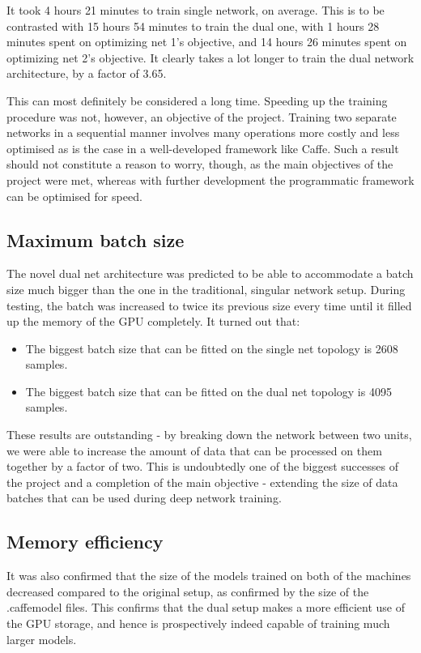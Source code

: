 \documentclass[a4paper, 12pt]{article}
\numberwithin{equation}{section}
\begin{document}
	It took 4 hours 21 minutes to train single network, on average. This is to be contrasted with 15 hours 54 minutes to train the dual one, with 1 hours 28 minutes spent on optimizing net 1's objective, and 14 hours 26 minutes spent on optimizing net 2's objective. It clearly takes a lot longer to train the dual network architecture, by a factor of 3.65.

	This can most definitely be considered a long time. Speeding up the training procedure was not, however, an objective of the project. Training two separate networks in a sequential manner involves  many operations more costly and less optimised as is the case in a well-developed framework like Caffe. Such a result should not constitute a reason to worry, though, as the main objectives of the project were met, whereas with further development the programmatic framework can be optimised for speed.

	\subsection{Maximum batch size}

	The novel dual net architecture was predicted to be able to accommodate a batch size much bigger than the one in the traditional, singular network setup. During testing, the batch was increased to twice its previous size every time until it filled up the memory of the GPU completely. It turned out that:
	\begin{itemize}
		\item The biggest batch size that can be fitted on the single net topology is 2608 samples.
		\item The biggest batch size that can be fitted on the dual net topology is 4095 samples.
	\end{itemize}

	These results are outstanding - by breaking down the network between two units, we were able to increase the amount of data that can be processed on them together by a factor of two. This is undoubtedly one of the biggest successes of the project and a completion of the main objective - extending the size of data batches that can be used during deep network training.
	
	\subsection{Memory efficiency}
	
	It was also confirmed that the size of the models trained on both of the machines decreased compared to the original setup, as confirmed by the size of the .caffemodel files. This confirms that the dual setup makes a more efficient use of the GPU storage, and hence is prospectively indeed capable of training much larger models.
\end{document}
